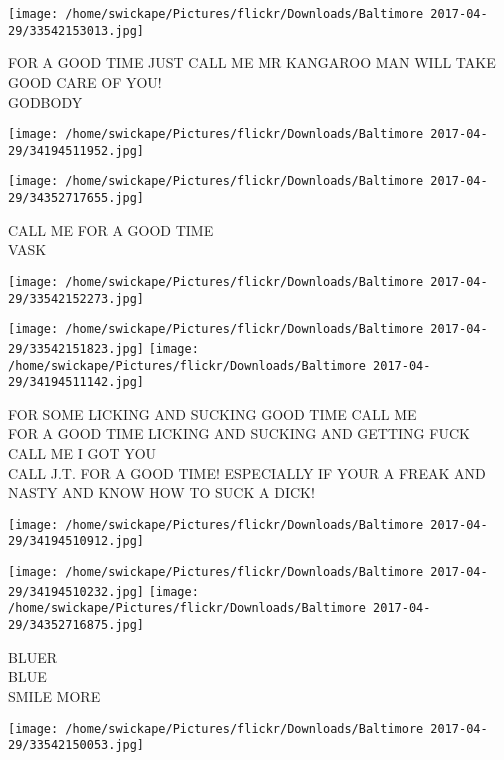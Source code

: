 \documentclass[10pt,letterpaper]{article}
\begin{document}
\vspace{0.25in}
\texttt{[image: /home/swickape/Pictures/flickr/Downloads/Baltimore 2017-04-29/33542153013.jpg]}

FOR A GOOD TIME JUST CALL ME MR KANGAROO MAN WILL TAKE GOOD CARE OF YOU!\\
GODBODY\\
\pagebreak

\texttt{[image: /home/swickape/Pictures/flickr/Downloads/Baltimore 2017-04-29/34194511952.jpg]}

\vspace{0.25in}
\texttt{[image: /home/swickape/Pictures/flickr/Downloads/Baltimore 2017-04-29/34352717655.jpg]}

CALL ME FOR A GOOD TIME\\
VASK\\
\pagebreak

\texttt{[image: /home/swickape/Pictures/flickr/Downloads/Baltimore 2017-04-29/33542152273.jpg]}

\vspace{0.25in}
\texttt{[image: /home/swickape/Pictures/flickr/Downloads/Baltimore 2017-04-29/33542151823.jpg]}
\texttt{[image: /home/swickape/Pictures/flickr/Downloads/Baltimore 2017-04-29/34194511142.jpg]}

FOR SOME LICKING AND SUCKING GOOD TIME CALL ME\\
FOR A GOOD TIME LICKING AND SUCKING AND GETTING FUCK CALL ME I GOT YOU\\
CALL J.T. FOR A GOOD TIME!   ESPECIALLY IF YOUR A FREAK AND NASTY AND KNOW HOW TO SUCK A DICK!\\
\pagebreak

\texttt{[image: /home/swickape/Pictures/flickr/Downloads/Baltimore 2017-04-29/34194510912.jpg]}

\vspace{0.25in}
\texttt{[image: /home/swickape/Pictures/flickr/Downloads/Baltimore 2017-04-29/34194510232.jpg]}
\texttt{[image: /home/swickape/Pictures/flickr/Downloads/Baltimore 2017-04-29/34352716875.jpg]}

BLUER\\
BLUE\\
SMILE MORE\\
\pagebreak

\texttt{[image: /home/swickape/Pictures/flickr/Downloads/Baltimore 2017-04-29/33542150053.jpg]}
\end{document}
